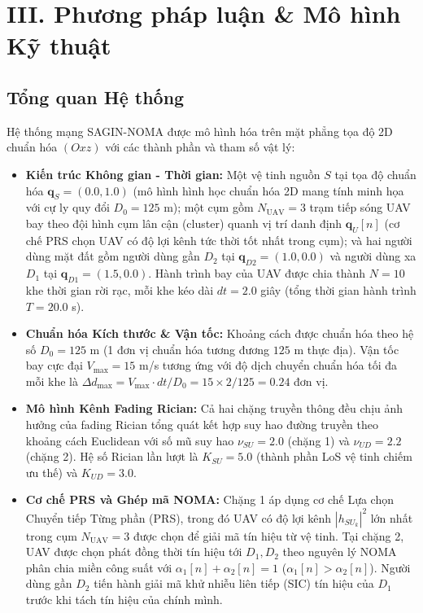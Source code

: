 \section*{III. Phương pháp luận \& Mô hình Kỹ thuật}

\subsection*{Tổng quan Hệ thống}
Hệ thống mạng SAGIN-NOMA được mô hình hóa trên mặt phẳng tọa độ 2D chuẩn hóa $(Oxz)$ với các thành phần và tham số vật lý:
\begin{itemize}[leftmargin=1.5em]
    \item \textbf{Kiến trúc Không gian - Thời gian:} Một vệ tinh nguồn $S$ tại tọa độ chuẩn hóa $\mathbf{q}_S = (0.0, 1.0)$ (mô hình hình học chuẩn hóa 2D mang tính minh họa với cự ly quy đổi $D_0 = 125$ m); một cụm gồm $N_{\text{UAV}} = 3$ trạm tiếp sóng UAV bay theo đội hình cụm lân cận (cluster) quanh vị trí danh định $\mathbf{q}_U[n]$ (cơ chế PRS chọn UAV có độ lợi kênh tức thời tốt nhất trong cụm); và hai người dùng mặt đất gồm người dùng gần $D_2$ tại $\mathbf{q}_{D2} = (1.0, 0.0)$ và người dùng xa $D_1$ tại $\mathbf{q}_{D1} = (1.5, 0.0)$. Hành trình bay của UAV được chia thành $N = 10$ khe thời gian rời rạc, mỗi khe kéo dài $dt = 2.0$ giây (tổng thời gian hành trình $T = 20.0$ s).
    \item \textbf{Chuẩn hóa Kích thước \& Vận tốc:} Khoảng cách được chuẩn hóa theo hệ số $D_0 = 125$ m (1 đơn vị chuẩn hóa tương đương $125$ m thực địa). Vận tốc bay cực đại $V_{\max} = 15$ m/s tương ứng với độ dịch chuyển chuẩn hóa tối đa mỗi khe là $\Delta d_{\max} = V_{\max} \cdot dt / D_0 = 15 \times 2 / 125 = 0.24$ đơn vị.
    \item \textbf{Mô hình Kênh Fading Rician:} Cả hai chặng truyền thông đều chịu ảnh hưởng của fading Rician tổng quát kết hợp suy hao đường truyền theo khoảng cách Euclidean với số mũ suy hao $\nu_{SU} = 2.0$ (chặng 1) và $\nu_{UD} = 2.2$ (chặng 2). Hệ số Rician lần lượt là $K_{SU} = 5.0$ (thành phần LoS vệ tinh chiếm ưu thế) và $K_{UD} = 3.0$.
    \item \textbf{Cơ chế PRS và Ghép mã NOMA:} Chặng 1 áp dụng cơ chế Lựa chọn Chuyển tiếp Từng phần (PRS), trong đó UAV có độ lợi kênh $|h_{SU_k}|^2$ lớn nhất trong cụm $N_{\text{UAV}} = 3$ được chọn để giải mã tín hiệu từ vệ tinh. Tại chặng 2, UAV được chọn phát đồng thời tín hiệu tới $D_1, D_2$ theo nguyên lý NOMA phân chia miền công suất với $\alpha_1[n] + \alpha_2[n] = 1$ ($\alpha_1[n] > \alpha_2[n]$). Người dùng gần $D_2$ tiến hành giải mã khử nhiễu liên tiếp (SIC) tín hiệu của $D_1$ trước khi tách tín hiệu của chính mình.
\end{itemize}

